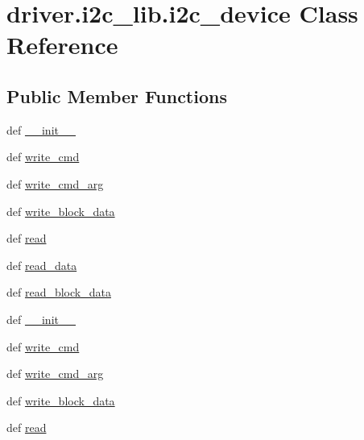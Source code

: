 \hypertarget{classdriver_1_1i2c__lib_1_1i2c__device}{}\section{driver.\+i2c\+\_\+lib.\+i2c\+\_\+device Class Reference}
\label{classdriver_1_1i2c__lib_1_1i2c__device}
\subsection*{Public Member Functions}
\begin{DoxyCompactItemize}
\item 
def \hyperlink{classdriver_1_1i2c__lib_1_1i2c__device_a6f4de0589e9fc9d80dfcbe78764adca6}{\+\_\+\+\_\+init\+\_\+\+\_\+}
\item 
def \hyperlink{classdriver_1_1i2c__lib_1_1i2c__device_a4793439f363c2b22a7f3beae6074f755}{write\+\_\+cmd}
\item 
def \hyperlink{classdriver_1_1i2c__lib_1_1i2c__device_ae998e6b6651a038c5b5466ae941e0eb8}{write\+\_\+cmd\+\_\+arg}
\item 
def \hyperlink{classdriver_1_1i2c__lib_1_1i2c__device_ae270018219f2f96ec9e37e36065d2edc}{write\+\_\+block\+\_\+data}
\item 
def \hyperlink{classdriver_1_1i2c__lib_1_1i2c__device_a9a8d9b4cc3d3890baa0738c9fa60ef4b}{read}
\item 
def \hyperlink{classdriver_1_1i2c__lib_1_1i2c__device_a7960797223c6a315d764f8b1ff11a8f2}{read\+\_\+data}
\item 
def \hyperlink{classdriver_1_1i2c__lib_1_1i2c__device_ad837253a1137bd4ae725f80640ace947}{read\+\_\+block\+\_\+data}
\item 
def \hyperlink{classdriver_1_1i2c__lib_1_1i2c__device_a6f4de0589e9fc9d80dfcbe78764adca6}{\+\_\+\+\_\+init\+\_\+\+\_\+}
\item 
def \hyperlink{classdriver_1_1i2c__lib_1_1i2c__device_a4793439f363c2b22a7f3beae6074f755}{write\+\_\+cmd}
\item 
def \hyperlink{classdriver_1_1i2c__lib_1_1i2c__device_ae998e6b6651a038c5b5466ae941e0eb8}{write\+\_\+cmd\+\_\+arg}
\item 
def \hyperlink{classdriver_1_1i2c__lib_1_1i2c__device_ae270018219f2f96ec9e37e36065d2edc}{write\+\_\+block\+\_\+data}
\item 
def \hyperlink{classdriver_1_1i2c__lib_1_1i2c__device_a9a8d9b4cc3d3890baa0738c9fa60ef4b}{read}
\item 

\end{DoxyCompactItemize}
